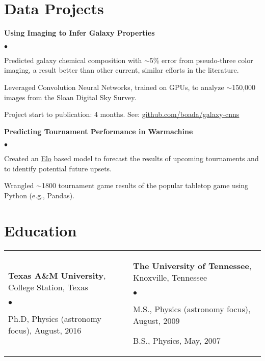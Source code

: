 \documentclass[margin,line, 11pt]{res}
\newenvironment{list2}{
  \begin{list}{$\bullet$}{%
      \setlength{\itemsep}{0in}
      \setlength{\parsep}{0in} \setlength{\parskip}{0in}
      \setlength{\topsep}{0in} \setlength{\partopsep}{0in}
      \setlength{\leftmargin}{0.2in}}}{\end{list}}
\begin{document}
\begin{resume}
\section{Data Projects}
\textbf{Using Imaging to Infer Galaxy Properties}\newline
    \begin{list2}
    	\vspace*{-5mm}
      \item Predicted galaxy chemical composition with $\sim$5\% error from pseudo-three color imaging, a result better than other current, similar efforts in the literature.
    	\item Leveraged Convolution Neural Networks, trained on GPUs, to analyze $\sim$150,000 images from the Sloan Digital Sky Survey.
      \item Project start to publication: 4 months. See: \href{https://github.com/boada/galaxy-cnns}{github.com/boada/galaxy-cnns}
    \end{list2}
    \vspace*{-4mm}
\textbf{Predicting Tournament Performance in Warmachine}\newline
    \begin{list2}
    	\vspace*{-5mm}
    	\item Created an \href{https://en.wikipedia.org/wiki/Elo_rating_system}{Elo} based model to forecast the results of upcoming tournaments and to identify potential future upsets.
    	\item Wrangled $\sim$1800 tournament game results of the popular tabletop game using Python (e.g., Pandas).
    \end{list2}
\vspace*{-2mm}


\section{Education}
\begin{tabular}{@{}p{3in}p{3in}}
  \textbf{Texas A\&M University}, College Station, Texas
  \begin{list2}
  	\item Ph.D, Physics (astronomy focus), August, 2016
  \end{list2} &
  \textbf{The University of Tennessee}, Knoxville, Tennessee
  \begin{list2}
  	\item M.S., Physics (astronomy focus),  August, 2009
  	\item B.S., Physics,  May, 2007
  \end{list2} \\
\end{tabular}
\vspace*{-4mm}

\end{resume}
\end{document}
